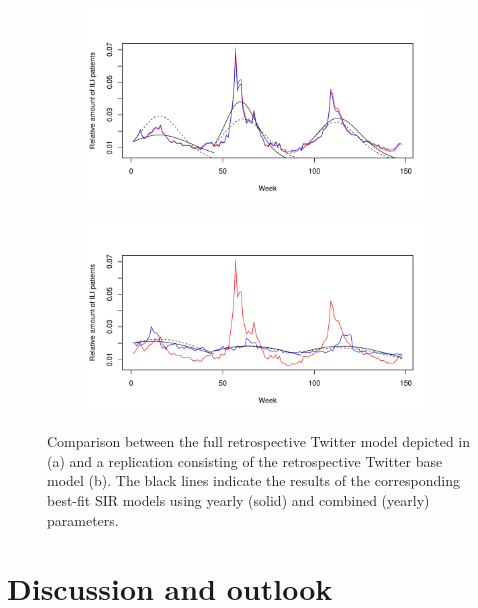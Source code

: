 \documentclass[11pt, a4paper,twoside]{report}\usepackage[]{graphicx}\usepackage[]{color}
\begin{document}
\begin{figure}[H]
\centering
  \begin{subfigure}[t]{1\textwidth}
  \includegraphics[width=1\linewidth]{40_SIR_model_full_both_25_colorised.pdf}
  \caption{}
  \end{subfigure}
  
  \begin{subfigure}[t]{1\textwidth}
  \includegraphics[width=1\linewidth]{42_SIR_model_full_base_model_100_colorised.pdf}
  \caption{}
  \label{fig:TwitterModel_comparison_AR2}
  \end{subfigure}
  \caption{Comparison between the full retrospective Twitter model depicted in \cite{bodnar_data_2015} (a) and a replication consisting of the retrospective Twitter base model (b). The black lines indicate the results of the corresponding best-fit SIR models using yearly (solid) and combined (yearly) parameters.}
  \label{fig:TwitterModel_comparison_base}
\end{figure}

\thispagestyle{empty}
\cleardoublepage

\chapter{Discussion and outlook}
\label{ch:discussion}
\end{document}
